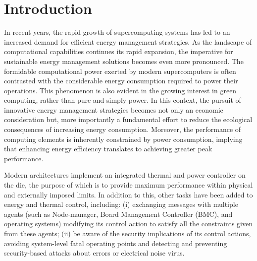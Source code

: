 

\section{Introduction}

In recent years, the rapid growth of supercomputing systems has led to an increased demand for efficient energy management strategies. As the landscape of computational capabilities continues its rapid expansion, the imperative for sustainable energy management solutions becomes even more pronounced. The formidable computational power exerted by modern supercomputers is often contrasted with the considerable energy consumption required to power their operations. This phenomenon is also evident in the growing interest in green computing, rather than pure and simply power\cite{Green}\cite{Green2}\cite{hardvard}. In this context, the pursuit of innovative energy management strategies becomes not only an economic consideration but, more importantly a fundamental effort to reduce the ecological consequences of increasing energy consumption. Moreover, the performance of computing elements is inherently constrained by power consumption, implying that enhancing energy efficiency translates to achieving greater peak performance.

Modern architectures implement an integrated thermal and power controller on the die, the purpose of which is to provide maximum performance within physical and externally imposed limits. In addition to this, other tasks have been added to energy and thermal control, including: 
(i) exchanging messages with multiple agents (such as Node-manager, Board Management Controller (BMC), and operating systems) modifying its control action to satisfy all the constraints given from these agents;
(ii) be aware of the security implications of its control actions, avoiding system-level fatal operating points and detecting and preventing security-based attacks about errors\cite{fbv} or electrical noise virus\cite{pnv}.

